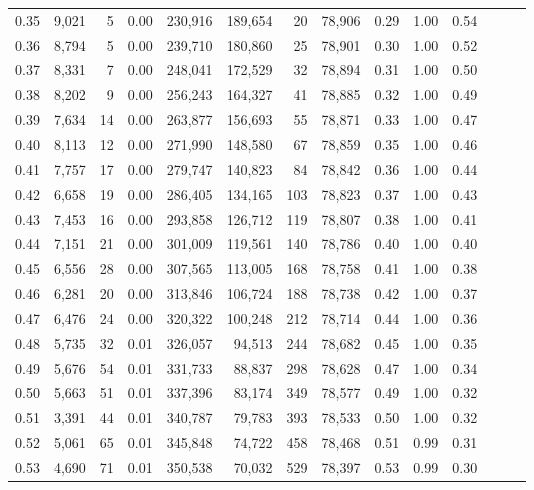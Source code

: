 \begin{tabular}{rrrrrrrrrrrrrr}
0.35 &  9,021 &      5 &  0.00 &  230,916 &  189,654 &      20 &  78,906 &  0.29 &  1.00 &      0.54 \\
0.36 &  8,794 &      5 &  0.00 &  239,710 &  180,860 &      25 &  78,901 &  0.30 &  1.00 &      0.52 \\
0.37 &  8,331 &      7 &  0.00 &  248,041 &  172,529 &      32 &  78,894 &  0.31 &  1.00 &      0.50 \\
0.38 &  8,202 &      9 &  0.00 &  256,243 &  164,327 &      41 &  78,885 &  0.32 &  1.00 &      0.49 \\
0.39 &  7,634 &     14 &  0.00 &  263,877 &  156,693 &      55 &  78,871 &  0.33 &  1.00 &      0.47 \\
0.40 &  8,113 &     12 &  0.00 &  271,990 &  148,580 &      67 &  78,859 &  0.35 &  1.00 &      0.46 \\
0.41 &  7,757 &     17 &  0.00 &  279,747 &  140,823 &      84 &  78,842 &  0.36 &  1.00 &      0.44 \\
0.42 &  6,658 &     19 &  0.00 &  286,405 &  134,165 &     103 &  78,823 &  0.37 &  1.00 &      0.43 \\
0.43 &  7,453 &     16 &  0.00 &  293,858 &  126,712 &     119 &  78,807 &  0.38 &  1.00 &      0.41 \\
0.44 &  7,151 &     21 &  0.00 &  301,009 &  119,561 &     140 &  78,786 &  0.40 &  1.00 &      0.40 \\
0.45 &  6,556 &     28 &  0.00 &  307,565 &  113,005 &     168 &  78,758 &  0.41 &  1.00 &      0.38 \\
0.46 &  6,281 &     20 &  0.00 &  313,846 &  106,724 &     188 &  78,738 &  0.42 &  1.00 &      0.37 \\
0.47 &  6,476 &     24 &  0.00 &  320,322 &  100,248 &     212 &  78,714 &  0.44 &  1.00 &      0.36 \\
0.48 &  5,735 &     32 &  0.01 &  326,057 &   94,513 &     244 &  78,682 &  0.45 &  1.00 &      0.35 \\
0.49 &  5,676 &     54 &  0.01 &  331,733 &   88,837 &     298 &  78,628 &  0.47 &  1.00 &      0.34 \\
0.50 &  5,663 &     51 &  0.01 &  337,396 &   83,174 &     349 &  78,577 &  0.49 &  1.00 &      0.32 \\
0.51 &  3,391 &     44 &  0.01 &  340,787 &   79,783 &     393 &  78,533 &  0.50 &  1.00 &      0.32 \\
0.52 &  5,061 &     65 &  0.01 &  345,848 &   74,722 &     458 &  78,468 &  0.51 &  0.99 &      0.31 \\
0.53 &  4,690 &     71 &  0.01 &  350,538 &   70,032 &     529 &  78,397 &  0.53 &  0.99 &      0.30 \\

\end{tabular}
